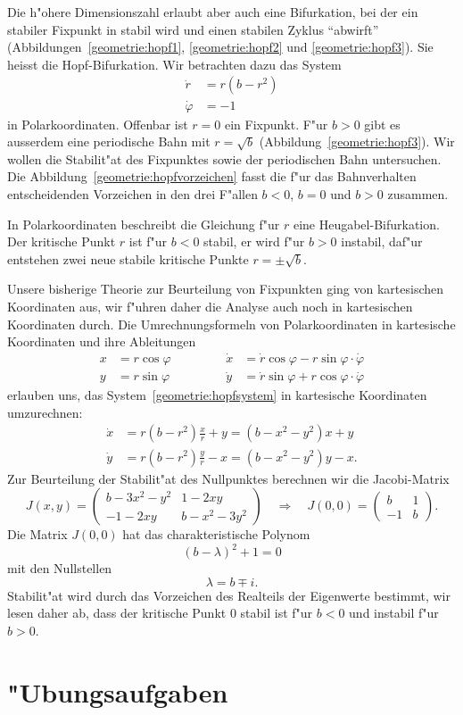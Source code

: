 Die h"ohere Dimensionszahl erlaubt aber auch eine Bifurkation, bei der
ein stabiler Fixpunkt in stabil wird und einen stabilen Zyklus ``abwirft''
(Abbildungen~\ref{geometrie:hopf1}, \ref{geometrie:hopf2} und
\ref{geometrie:hopf3}).
Sie heisst die Hopf-Bifurkation.
Wir betrachten dazu das System 
\begin{equation}
\begin{aligned}
\dot r      &= r(b-r^2)\\
\dot \varphi&= -1
\end{aligned}
\label{geometrie:hopfsystem}
\end{equation}
in Polarkoordinaten.
Offenbar ist $r=0$ ein Fixpunkt.
F"ur $b>0$ gibt es ausserdem eine periodische Bahn mit $r=\sqrt{b}$
(Abbildung~\ref{geometrie:hopf3}).
Wir wollen die Stabilit"at des Fixpunktes sowie der periodischen Bahn
untersuchen.
Die Abbildung~\ref{geometrie:hopfvorzeichen} fasst die f"ur das Bahnverhalten
entscheidenden Vorzeichen in den drei F"allen $b<0$, $b=0$ und $b>0$
zusammen.

In Polarkoordinaten beschreibt die Gleichung f"ur $r$ eine
Heugabel-Bifurkation.
Der kritische Punkt $r$ ist f"ur $b<0$ stabil, er wird f"ur $b>0$
instabil, daf"ur entstehen zwei neue stabile kritische Punkte
$r=\pm\sqrt{b}$.

Unsere bisherige Theorie zur Beurteilung von Fixpunkten ging von
kartesischen Koordinaten aus, wir f"uhren daher die Analyse auch noch
in kartesischen Koordinaten durch.
Die Umrechnungsformeln von Polarkoordinaten in kartesische Koordinaten
und ihre Ableitungen
\[
\begin{aligned}
x&=r\cos\varphi&&\qquad&\dot x&=\dot r\cos\varphi-r\sin\varphi\cdot\dot\varphi\\
y&=r\sin\varphi&&\qquad&\dot y&=\dot r\sin\varphi+r\cos\varphi\cdot\dot\varphi
\end{aligned}
\]
erlauben uns,
das System~\eqref{geometrie:hopfsystem} in kartesische Koordinaten
umzurechnen:
\begin{equation}
\begin{aligned}
\dot x&=r(b-r^2)\frac{x}{r}+y=(b-x^2-y^2)x+y\\
\dot y&=r(b-r^2)\frac{y}{r}-x=(b-x^2-y^2)y-x.
\end{aligned}
\label{geometrie:hopf-kartesisch}
\end{equation}
Zur Beurteilung der Stabilit"at des Nullpunktes berechnen wir die
Jacobi-Matrix
\[
J(x,y)=
\begin{pmatrix}
b-3x^2-y^2&1-2xy\\
-1-2xy&b-x^2-3y^2
\end{pmatrix}
\quad\Rightarrow\quad
J(0,0)=\begin{pmatrix}
b&1\\-1&b
\end{pmatrix}.
\]
Die Matrix $J(0,0)$ hat das charakteristische Polynom
\[
(b-\lambda)^2+1=0
\]
mit den Nullstellen
\[
\lambda=b\mp i.
\]
Stabilit"at wird durch das Vorzeichen des Realteils der Eigenwerte
bestimmt, wir lesen daher ab, dass der kritische Punkt $0$ stabil
ist f"ur $b<0$ und instabil f"ur $b>0$.

\section{"Ubungsaufgaben}

